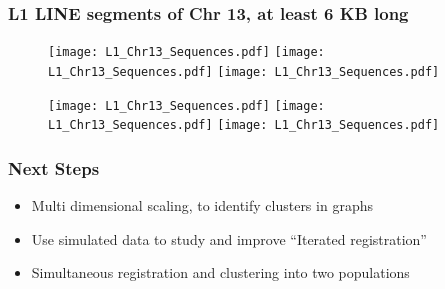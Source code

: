\documentclass[10pt,dvipsnames,table]{beamer}
\begin{document}
\begin{frame}
\frametitle{L1 LINE segments of Chr 13, at least 6 KB long}
\begin{figure}
\centering
\texttt{[image: L1\_Chr13\_Sequences.pdf]}
\texttt{[image: L1\_Chr13\_Sequences.pdf]} 
\texttt{[image: L1\_Chr13\_Sequences.pdf]} 
\end{figure}
\begin{figure}
\texttt{[image: L1\_Chr13\_Sequences.pdf]} 
\texttt{[image: L1\_Chr13\_Sequences.pdf]}
\texttt{[image: L1\_Chr13\_Sequences.pdf]} 
\end{figure}
\end{frame}

\begin{frame}
\frametitle{Next Steps}
\begin{itemize}
\pause \item Multi dimensional scaling, to identify clusters in graphs
\pause \item Use simulated data to study and improve ``Iterated registration''
\pause \item Simultaneous registration and clustering into two populations
\end{itemize}
\end{frame}
\end{document}
